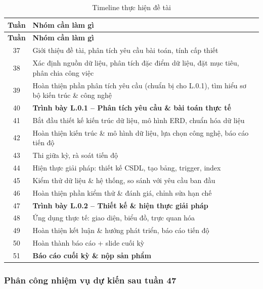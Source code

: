 \documentclass{../hcmut-report}
\begin{document}
\begin{longtable}{|c|p{11cm}|}
\caption{Timeline thực hiện đề tài} \\
\hline
\textbf{Tuần} & \textbf{Nhóm cần làm gì} \\
\hline
\endfirsthead

\hline
\textbf{Tuần} & \textbf{Nhóm cần làm gì} \\
\hline
\endhead

\hline
\endfoot

\hline
\endlastfoot

37 & Giới thiệu đề tài, phân tích yêu cầu bài toán, tính cấp thiết \\ \hline
38 & Xác định nguồn dữ liệu, phân tích đặc điểm dữ liệu, đặt mục tiêu, phân chia công việc \\ \hline
39 & Hoàn thiện phần phân tích yêu cầu (chuẩn bị cho L.0.1), tìm hiểu sơ bộ kiến trúc \& công nghệ \\ \hline
40 & \textbf{Trình bày L.0.1 – Phân tích yêu cầu \& bài toán thực tế} \\ \hline
41 & Bắt đầu thiết kế kiến trúc dữ liệu, mô hình ERD, chuẩn hóa dữ liệu \\ \hline
42 & Hoàn thiện kiến trúc \& mô hình dữ liệu, lựa chọn công nghệ, báo cáo tiến độ \\ \hline
43 & Thi giữa kỳ, rà soát tiến độ \\ \hline
44 & Hiện thực giải pháp: thiết kế CSDL, tạo bảng, trigger, index \\ \hline
45 & Kiểm thử dữ liệu \& hệ thống, so sánh với yêu cầu ban đầu \\ \hline
46 & Hoàn thiện phần kiểm thử \& đánh giá, chỉnh sửa hạn chế \\ \hline
47 & \textbf{Trình bày L.0.2 – Thiết kế \& hiện thực giải pháp} \\ \hline
48 & Ứng dụng thực tế: giao diện, biểu đồ, trực quan hóa \\ \hline
49 & Hoàn thiện kết luận \& hướng phát triển, báo cáo tiến độ \\ \hline
50 & Hoàn thành báo cáo + slide cuối kỳ \\ \hline
51 & \textbf{Báo cáo cuối kỳ \& nộp sản phẩm} \\ \hline

\end{longtable}


\subsubsection{Phân công nhiệm vụ dự kiến sau tuần 47}
\end{document}
